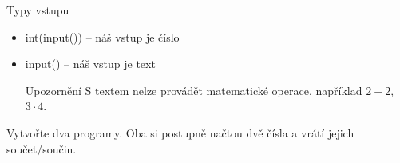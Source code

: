 \documentclass{beamer}
\begin{document}
\begin{frame}[t]{Typy vstupu}

\begin{itemize}
	\item \textsf{int(input())} -- náš vstup je číslo
	
	\item \textsf{input()} -- náš vstup je text 
	
	\pause	
	
	\begin{block}{Upozornění}
	S textem nelze provádět matematické operace, například $2 + 2$, $3 \cdot 4$.
	\end{block}
\end{itemize}

\vspace{0.3cm}

\begin{example}
Vytvořte dva programy. Oba si postupně načtou dvě čísla a vrátí jejich součet/součin.

\end{example}


\end{frame}
\end{document}
